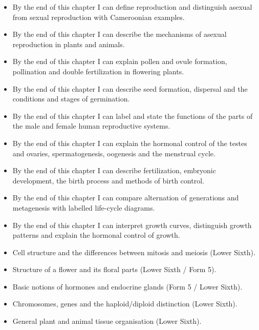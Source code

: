 \documentclass[11pt]{article}
\begin{document}
\begin{objectifs}
\begin{itemize}
\item By the end of this chapter I can define reproduction and distinguish asexual from sexual reproduction with Cameroonian examples.
\item By the end of this chapter I can describe the mechanisms of asexual reproduction in plants and animals.
\item By the end of this chapter I can explain pollen and ovule formation, pollination and double fertilization in flowering plants.
\item By the end of this chapter I can describe seed formation, dispersal and the conditions and stages of germination.
\item By the end of this chapter I can label and state the functions of the parts of the male and female human reproductive systems.
\item By the end of this chapter I can explain the hormonal control of the testes and ovaries, spermatogenesis, oogenesis and the menstrual cycle.
\item By the end of this chapter I can describe fertilization, embryonic development, the birth process and methods of birth control.
\item By the end of this chapter I can compare alternation of generations and metagenesis with labelled life-cycle diagrams.
\item By the end of this chapter I can interpret growth curves, distinguish growth patterns and explain the hormonal control of growth.
\end{itemize}
\end{objectifs}

\begin{prerequis}
\begin{itemize}
\item Cell structure and the differences between mitosis and meiosis (Lower Sixth).
\item Structure of a flower and its floral parts (Lower Sixth / Form 5).
\item Basic notions of hormones and endocrine glands (Form 5 / Lower Sixth).
\item Chromosomes, genes and the haploid/diploid distinction (Lower Sixth).
\item General plant and animal tissue organisation (Lower Sixth).
\end{itemize}
\end{prerequis}
\end{document}
